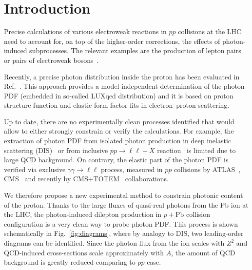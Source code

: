 \section{Introduction}

Precise calculations of various electroweak reactions in $pp$ collisions at the LHC need to account for, on top of the higher-order corrections, the effects of photon-induced subprocesses.
The relevant examples are the production of lepton pairs~\cite{Aad:2014qja, Aad:2016zzw,Accomando:2016tah, Luszczak:2015aoa, Harland-Lang:2016apc} or pairs of electroweak bosons~\cite{Luszczak:2014mta, Denner:2015fca, Dyndal:2015hrp, Ababekri:2016kkj, Biedermann:2016guo, Biedermann:2016yvs, Yong:2016njr, Luszczak:2018ntp}.


Recently, a precise photon distribution inside the proton has been evaluated in Ref.~\cite{Manohar:2016nzj}.
This approach provides a model-independent determination of the photon PDF (embedded in so-called LUXqed distribution)
and  it is based on proton structure function and elastic form factor fits in electron--proton scattering.

Up to date, there are no experimentally clean processes identified that would allow to either strongly constrain or verify the calculations.
For example, the extraction of photon PDF from isolated photon production in deep inelastic scattering (DIS)~\cite{Schmidt:2015zda} 
or from inclusive $pp\rightarrow\ell\ell+X$ reaction~\cite{Ball:2013hta, Aad:2016zzw, Giuli:2017oii} is limited due to large QCD background.
On contrary, the elastic part of the photon PDF is verified via exclusive $\gamma\gamma\rightarrow\ell\ell$ process, measured in $pp$ collisions by ATLAS~\cite{Aad:2015bwa,Aaboud:2017oiq}, CMS~\cite{Chatrchyan:2011ci,Chatrchyan:2012tv} and recently by CMS+TOTEM~\cite{Cms:2018het} collaborations.




We therefore propose a new experimental method to constrain photonic content of the proton.
Thanks to the large fluxes of quasi-real photons from the Pb ion at the LHC, the photon-induced dilepton production in $p+\textrm{Pb}$ collision configuration is a very clean way to probe photon PDF.
This process is shown schematically in Fig.~\ref{fig:diagrams}, where by analogy to DIS, two leading-order diagrams can be identified.
Since the photon flux from the ion scales with $Z^2$ and QCD-induced cross-sections scale approximately with $A$,
the amount of QCD background is greatly reduced comparing to $pp$ case.

